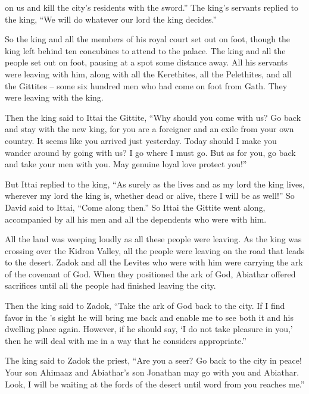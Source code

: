 {on us and kill
the city’s residents
with the sword.”
The king’s
servants
replied
to
the king,
“We
will do whatever
our lord
the king decides.”
\par }{\PP {}So
the king
and all
the members
of his royal
court set out
on foot,
though the king
left
behind ten
concubines
to attend
to the palace.
The king
and all
the people
set out
on foot,
pausing at a spot some distance away.
All
his servants
were leaving
with him, along
with all
the Kerethites,
all
the Pelethites,
and all
the Gittites
– some six
hundred
men
who had
come
on foot
from Gath.
They were leaving
with the king.
\par }{\PP {}Then the king
said
to Ittai
the Gittite,
“Why
should
you
come
with
us? Go back
and stay
with
the new king,
for
you
are a foreigner
and an exile
from your
own country.
It seems like you arrived
just yesterday.
Today
should I make you wander around
by going
with
us? I
go
where
I
must go.
But as for you, go back
and take
your men
with
you. May genuine loyal love protect you!”
\par }{\PP {}But Ittai
replied
to the
king,
“As surely
as the
{}
lives
and as my lord
the king
lives, wherever
my lord
the king
is, whether
dead
or
alive,
there
I will be
as well!”
So David
said
to
Ittai,
“Come along
then.” So Ittai
the Gittite
went along,
accompanied
by all
his men
and all
the dependents
who
were with him.
\par }{\PP {}All
the land
was weeping
loudly
as all
these people
were leaving.
As the king
was crossing
over the Kidron
Valley,
all
the people
were leaving
on
the road
that leads to the desert.
Zadok
and all
the Levites
who were with
him were carrying
the ark
of the covenant
of God.
When they positioned
the
ark
of God,
Abiathar
offered
sacrifices until
all
the people
had finished leaving
the city.
\par }{\PP {}Then the king
said
to Zadok,
“Take the
ark
of God
back to the city.
If
I find
favor
in the
{}’s
sight
he will bring me back
and enable me to see
both it and his dwelling place again.
However, if
he should
say,
‘I
do not
take pleasure
in you,’ then he will deal with me in a way that
he considers
appropriate.”
\par }{\PP {}The king
said
to
Zadok
the priest,
“Are you
a seer? Go back
to the city
in peace! Your son
Ahimaaz
and Abiathar’s son
Jonathan
may go with
you and Abiathar.
Look,
I
will be waiting
at the fords
of the desert
until
word
from you reaches me.”
}
